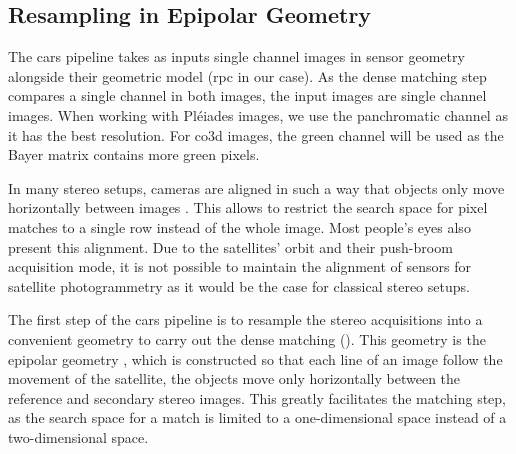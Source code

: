 \subsection{Resampling in Epipolar Geometry}\label{sec:epipolar_geometry}

The \acrshort{cars} pipeline takes as inputs single channel images in sensor geometry alongside their geometric model (\acrshort{rpc} in our case). As the dense matching step compares a single channel in both images, the input images are single channel images. When working with Pléiades images, we use the panchromatic channel as it has the best resolution. For \acrshort{co3d} images, the green channel will be used as the Bayer matrix contains more green pixels.

In many stereo setups, cameras are aligned in such a way that objects only move horizontally between images \cite{geiger_are_2012, scharstein_high-resolution_2014, keselman_intel_2017}. This allows to restrict the search space for pixel matches to a single row instead of the whole image. Most people's eyes also present this alignment. Due to the satellites' orbit and their push-broom acquisition mode, it is not possible to maintain the alignment of sensors for satellite photogrammetry as it would be the case for classical stereo setups.

The first step of the \acrshort{cars} pipeline is to resample the stereo acquisitions into a convenient geometry to carry out the dense matching (). This geometry is the epipolar geometry \cite{cnes_imagerie_2008}, which is constructed so that each line of an image follow the movement of the satellite, \ie the objects move only horizontally between the reference and secondary stereo images. This greatly facilitates the matching step, as the search space for a match is limited to a one-dimensional space instead of a two-dimensional space.

